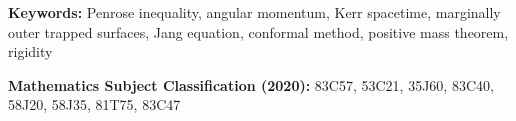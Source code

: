 \vspace{0.5cm}
\noindent\textbf{Keywords:} Penrose inequality, angular momentum, Kerr spacetime, marginally outer trapped surfaces, Jang equation, conformal method, positive mass theorem, rigidity

\vspace{0.3cm}
\noindent\textbf{Mathematics Subject Classification (2020):} 83C57, 53C21, 35J60, 83C40, 58J20, 58J35, 81T75, 83C47

\tableofcontents
